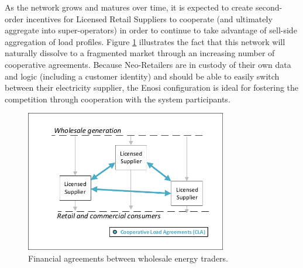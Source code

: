 \documentclass[a4paper,12pt,reqno]{amsart}
\theoremstyle{definition}
\begin{document}
As the network grows and matures over time, it is expected to create second-order incentives for Licensed Retail Suppliers to cooperate (and ultimately aggregate into super-operators) in order to continue to take advantage of sell-side aggregation of load profiles. Figure \ref{fig3} illustrates the fact that this network will naturally dissolve to a fragmented market through an increasing number of cooperative agreements. Because Neo-Retailers are in custody of their own data and logic (including a customer identity) and should be able to easily switch between their electricity supplier, the Enosi configuration is ideal for fostering the competition through cooperation with the system participants. 
% 
% 
% 
% 
% 


\begin{figure}
\begin{center}
\includegraphics[width=250pt]{enosi-cla}
\caption{Financial agreements between wholesale energy traders.}\label{fig3}
\end{center}
\end{figure}
\end{document}
